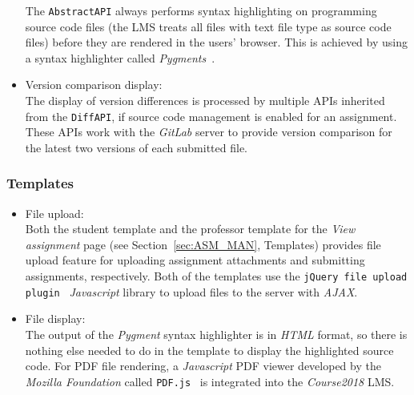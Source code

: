 \begin{itemize}
    The \texttt{AbstractAPI} always performs
    syntax highlighting on programming source code files
    (the LMS treats all files with text file type as source code files)
    before they are rendered in the users' browser.
    This is achieved by
    using a syntax highlighter called \emph{Pygments}~\cite{pygments}.

    \item Version comparison display: \\
    The display of version differences is processed by multiple APIs inherited
    from the \texttt{Diff\-API}, if source code management is enabled for an
    assignment. These APIs work with the \emph{GitLab} server to provide version
    comparison for the latest two versions of each submitted file.
\end{itemize}

\subsubsection{Templates}
\begin{itemize}
    \item File upload: \\
        Both the student template and the professor template for the
        \emph{View assignment} page (see Section~\ref{sec:ASM_MAN}, Templates)
        provides file upload feature for uploading
        assignment attachments and submitting assignments, respectively.
        Both of the templates use the
        \texttt{jQuery file upload plugin}~\citep[Section Description]{jqFileUpload}
        \emph{Javascript} library to upload files to the server with
        \emph{AJAX}.
    \item File display: \\
        The output of the \emph{Pygment} syntax highlighter is in \emph{HTML}
        format, so there is nothing else needed to do in the template to
        display the highlighted source code.
        For PDF file rendering, a \emph{Javascript} PDF viewer developed
        by the \emph{Mozilla Foundation} called \texttt{PDF.js}~\cite{pdfjs}
        is integrated into the \emph{Course2018} LMS.
\end{itemize}

\FloatBarrier





